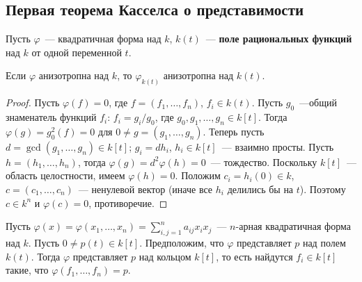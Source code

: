 \documentclass[a4paper,oneside,12pt]{article}
\theoremstyle{plain} { \swapnumbers
\newtheorem{theorem}{Теорема}[subsection]
\newtheorem{corollary}[theorem]{Следствие}
\newtheorem{lemma}[theorem]{Лемма}
\newtheorem{proposition}[theorem]{Утверждение}
\newtheorem{claim}[theorem]{Факт}
}
\theoremstyle{definition} { \swapnumbers
\newtheorem{definition}[theorem]{Определение}
\newtheorem{notation}[theorem]{Обозначение}
\newtheorem{remark}[theorem]{Замечание}
\newtheorem{remarks}[theorem]{Замечания}
\newtheorem{example}[theorem]{Пример}
\newtheorem{examples}[theorem]{Примеры}
\newtheorem{sssection}[theorem]{}
}
\def\ph{\varphi}
\begin{document}
\subsection{Первая теорема Касселса о представимости}

Пусть $\ph$~--- квадратичная форма над $k$, $k(t)$~--- {\bf поле рациональных функций}
над $k$ от одной переменной $t$.

\begin{lemma}
Если $\ph$ анизотропна над $k$, то $\ph_{k(t)}$ анизотропна над $k(t)$.
\end{lemma}
\begin{proof}
Пусть $\ph(f)=0$, где $f=(f_1,\dots,f_n)$, $f_i\in k(t)$. Пусть $g_0$~---общий знаменатель
функций $f_i$: $f_i=g_i/g_0$, где $g_0,g_1,\dots,g_n\in k[t]$. Тогда $\ph(g)=g_0^2(f)=0$
для $0\neq g=(g_1,\dots,g_n)$. Теперь пусть $d=\gcd(g_1,\dots,g_n)\in k[t]$;
$g_i=dh_i$, $h_i\in k[t]$~--- взаимно просты. Пусть $h=(h_1,\dots,h_n)$, тогда
$\ph(g)=d^2\ph(h)=0$~--- тождество. Поскольку $k[t]$~--- область целостности, имеем
$\ph(h)=0$. Положим $c_i=h_i(0)\in k$, $c=(c_1,\dots,c_n)$~--- ненулевой вектор
(иначе все $h_i$ делились бы на $t$). Поэтому $c\in k^n$ и $\ph(c)=0$, противоречие.
\end{proof}
\begin{theorem}
Пусть $\ph(x)=\ph(x_1,\dots,x_n)=\sum_{i,j=1}^n{a_{ij}x_ix_j}$~--- $n$-арная квадратичная форма
над $k$. Пусть $0\neq p(t)\in k[t]$. Предположим, что $\ph$ представляет $p$ над полем $k(t)$.
Тогда $\ph$ представляет $p$ над кольцом $k[t]$, то есть найдутся $f_i\in k[t]$ такие,
что $\ph(f_1,\dots,f_n)=p$.
\end{theorem}
\end{document}
